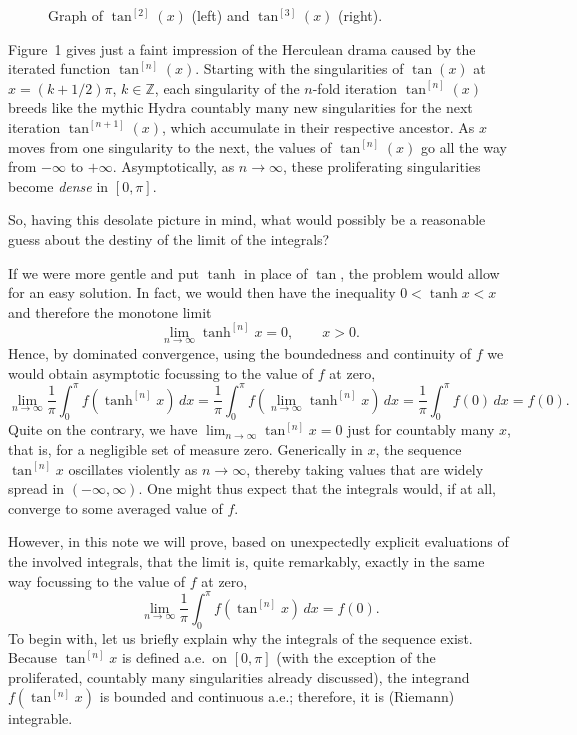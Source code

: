 \documentclass[10pt]{amsart}
\newcommand{\Z}{{\mathbb  Z}}
\begin{document}
\begin{figure}[hb]
\begin{center}
\end{center}
\caption{Graph of  $\tan^{[2]}(x)$ (left) and $\tan^{[3]}(x)$ (right).}
\end{figure}
%
\noindent
Figure~1 gives just a faint impression of the Herculean drama caused by the iterated function $\tan^{[n]}(x)$. Starting with the singularities
of $\tan(x)$ at $x=(k+1/2)\pi$, $k \in \Z$, each singularity of the $n$-fold iteration $\tan^{[n]}(x)$
breeds like the mythic Hydra countably many new singularities for the next iteration $\tan^{[n+1]}(x)$, which accumulate in their respective ancestor.
As $x$ moves from one singularity to the next, the values of $\tan^{[n]}(x)$  go all the way from $-\infty$ to $+\infty$. Asymptotically,
as $n\to\infty$, these proliferating singularities become \emph{dense} in $[0,\pi]$.

So, having this desolate picture in mind, what would possibly be a reasonable guess about the destiny of the limit of the integrals?

If we were more gentle and put $\tanh$ in place of $\tan$, the problem would allow for an easy solution. In fact,
we would then have the inequality $0 < \tanh x<x$ and therefore the monotone limit
\begin{equation}\label{eq.tanh}
\lim_{n\to\infty} \tanh^{[n]} x = 0,\qquad x>0.
\end{equation}
Hence, by dominated convergence, using the boundedness and continuity of $f$ we would obtain asymptotic focussing to the value of $f$ at zero,
\[
\lim_{n\to\infty} \frac{1}{\pi}\int_0^\pi f(\tanh^{[n]}x)\,dx = \frac{1}{\pi}\int_0^\pi f(\lim_{n\to\infty} \tanh^{[n]}x)\,dx = \frac{1}{\pi}\int_0^\pi f(0)\,dx = f(0).
\]
Quite on the contrary, we have $\lim_{n\to\infty} \tan^{[n]} x = 0$ just for countably many $x$, that is, for a negligible set
of measure zero. Generically in $x$, the sequence $\tan^{[n]} x$ oscillates violently as $n \to \infty$, thereby taking values that are widely spread in
$(-\infty,\infty)$.
One might thus expect that the integrals would, if at all, converge to some averaged value of $f$.

However, in this note we will prove, based on unexpectedly explicit evaluations of the involved integrals,
that the limit is, quite remarkably, exactly in the same way focussing to the value of $f$ at zero,
\begin{equation}\label{eq.claim}
{\lim_{n\to\infty}\frac{1}{\pi}\int_0^\pi f(\tan^{[n]}x)\,dx = f(0).}
\end{equation}
To begin with, let us briefly explain why the integrals of the sequence exist. Because $\tan^{[n]} x$ is defined a.e.~on $[0,\pi]$ (with the exception of the proliferated, countably many
singularities already discussed), the integrand $f(\tan^{[n]} x)$ is bounded and continuous a.e.; therefore,
it is (Riemann) integrable.
\end{document}
